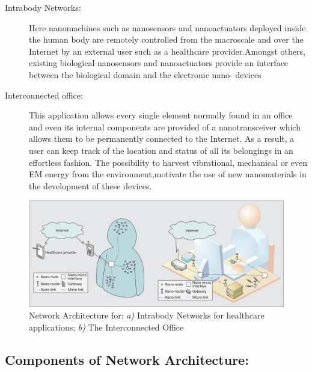 \documentclass{report}
\begin{document}
    \begin{enumerate}

        \begin{description}

            \item[Intrabody Networks:]Here nanomachines such as nanosensors and nanoactuators deployed inside the human body are remotely controlled from the macroscale and over the Internet by an external user such as a healthcare provider.Amongst others, existing biological nanosensors and nanoactuators provide an interface between the biological domain and the electronic nano- devices
            
            \item[Interconnected office:]This application allows every single element normally found in an office and even its internal components are provided of a nanotransceiver which allows them to be permanently connected to the Internet. As a result, a user can keep track of the location and status of all its belongings in an effortless fashion. The possibility to harvest vibrational, mechanical or even EM energy from the environment,motivate the use of new nanomaterials in the development of these devices.
            
        \end{description}
         
    \end{enumerate}

    \begin{figure}[h]
        \centering
        \includegraphics[width=12cm]{img.jpg}
        \caption{Network Architecture for: \textit{a) }Intrabody Networks for healthcare applications; \textit{b) }The Interconnected Office}
        \label{fig:my_label}
    \end{figure}

\subsection*{Components of Network Architecture:}
\end{document}
